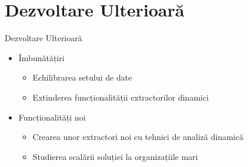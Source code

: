 \section{Dezvoltare Ulterioară}

\begin{frame}{Dezvoltare Ulterioară} \pause
	\begin{itemize}
		\item Îmbunătățiri \pause
		\begin{itemize}
		    \item Echilibrarea setului de date \pause
		    \item Extinderea funcționalității extractorilor dinamici \pause
		\end{itemize}
		\item Funcționalități noi \pause
		\begin{itemize}
		    \item Crearea unor extractori noi cu tehnici de analiză dinamică \pause
		    \item Studierea scalării soluției la organizațiile mari
		\end{itemize}
	\end{itemize}
\end{frame}